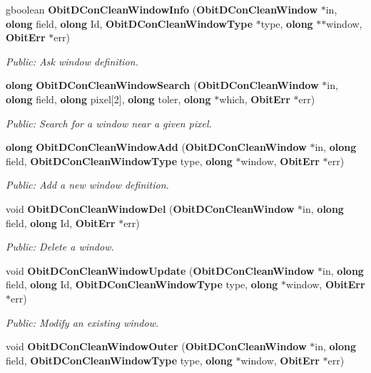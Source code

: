 \begin{CompactItemize}
gboolean {\bf Obit\-DCon\-Clean\-Window\-Info} ({\bf Obit\-DCon\-Clean\-Window} $\ast$in, {\bf olong} field, {\bf olong} Id, {\bf Obit\-DCon\-Clean\-Window\-Type} $\ast$type, {\bf olong} $\ast$$\ast$window, {\bf Obit\-Err} $\ast$err)
\begin{CompactList}\small\item\em Public: Ask window definition. \item\end{CompactList}\item 
{\bf olong} {\bf Obit\-DCon\-Clean\-Window\-Search} ({\bf Obit\-DCon\-Clean\-Window} $\ast$in, {\bf olong} field, {\bf olong} pixel[2], {\bf olong} toler, {\bf olong} $\ast$which, {\bf Obit\-Err} $\ast$err)
\begin{CompactList}\small\item\em Public: Search for a window near a given pixel. \item\end{CompactList}\item 
{\bf olong} {\bf Obit\-DCon\-Clean\-Window\-Add} ({\bf Obit\-DCon\-Clean\-Window} $\ast$in, {\bf olong} field, {\bf Obit\-DCon\-Clean\-Window\-Type} type, {\bf olong} $\ast$window, {\bf Obit\-Err} $\ast$err)
\begin{CompactList}\small\item\em Public: Add a new window definition. \item\end{CompactList}\item 
void {\bf Obit\-DCon\-Clean\-Window\-Del} ({\bf Obit\-DCon\-Clean\-Window} $\ast$in, {\bf olong} field, {\bf olong} Id, {\bf Obit\-Err} $\ast$err)
\begin{CompactList}\small\item\em Public: Delete a window. \item\end{CompactList}\item 
void {\bf Obit\-DCon\-Clean\-Window\-Update} ({\bf Obit\-DCon\-Clean\-Window} $\ast$in, {\bf olong} field, {\bf olong} Id, {\bf Obit\-DCon\-Clean\-Window\-Type} type, {\bf olong} $\ast$window, {\bf Obit\-Err} $\ast$err)
\begin{CompactList}\small\item\em Public: Modify an existing window. \item\end{CompactList}\item 
void {\bf Obit\-DCon\-Clean\-Window\-Outer} ({\bf Obit\-DCon\-Clean\-Window} $\ast$in, {\bf olong} field, {\bf Obit\-DCon\-Clean\-Window\-Type} type, {\bf olong} $\ast$window, {\bf Obit\-Err} $\ast$err)
$$
\end{CompactItemize}
